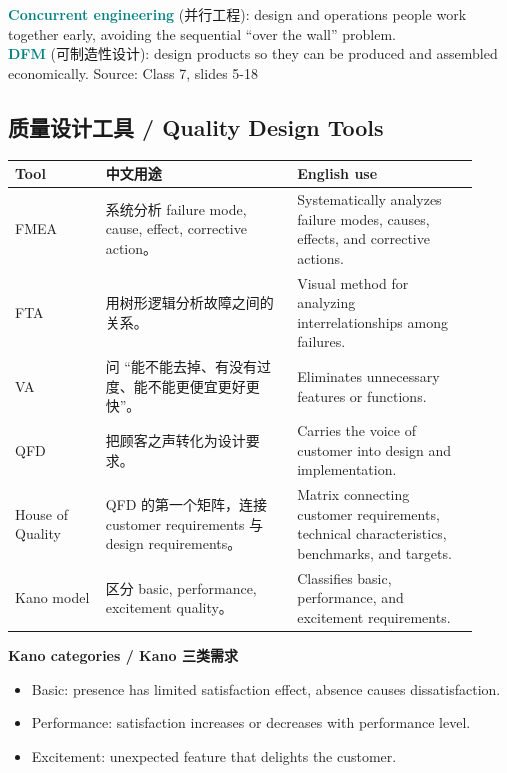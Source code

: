 \documentclass[10pt,a4paper]{ctexart}
\newcommand{\term}[2]{\textbf{\textcolor{Teal}{#1}} \textcolor{Muted}{(#2)}}
\newcommand{\source}[1]{\textcolor{Muted}{\footnotesize Source: #1}}
\begin{document}
\term{Concurrent engineering}{并行工程}: design and operations people work together early, avoiding the sequential ``over the wall'' problem.\\
\term{DFM}{可制造性设计}: design products so they can be produced and assembled economically.
\source{Class 7, slides 5-18}

\subsection{质量设计工具 / Quality Design Tools}
\label{subsec:quality-tools}

\begin{longtable}{@{}L{0.18\linewidth}L{0.38\linewidth}L{0.36\linewidth}@{}}
\toprule
\textbf{Tool} & \textbf{中文用途} & \textbf{English use} \\
\midrule
FMEA & 系统分析 failure mode, cause, effect, corrective action。 & Systematically analyzes failure modes, causes, effects, and corrective actions. \\
FTA & 用树形逻辑分析故障之间的关系。 & Visual method for analyzing interrelationships among failures. \\
VA & 问 ``能不能去掉、有没有过度、能不能更便宜更好更快''。 & Eliminates unnecessary features or functions. \\
QFD & 把顾客之声转化为设计要求。 & Carries the voice of customer into design and implementation. \\
House of Quality & QFD 的第一个矩阵，连接 customer requirements 与 design requirements。 & Matrix connecting customer requirements, technical characteristics, benchmarks, and targets. \\
Kano model & 区分 basic, performance, excitement quality。 & Classifies basic, performance, and excitement requirements. \\
\bottomrule
\end{longtable}

\textbf{Kano categories / Kano 三类需求}
\begin{itemize}
  \item Basic: presence has limited satisfaction effect, absence causes dissatisfaction.
  \item Performance: satisfaction increases or decreases with performance level.
  \item Excitement: unexpected feature that delights the customer.
\end{itemize}
\end{document}
